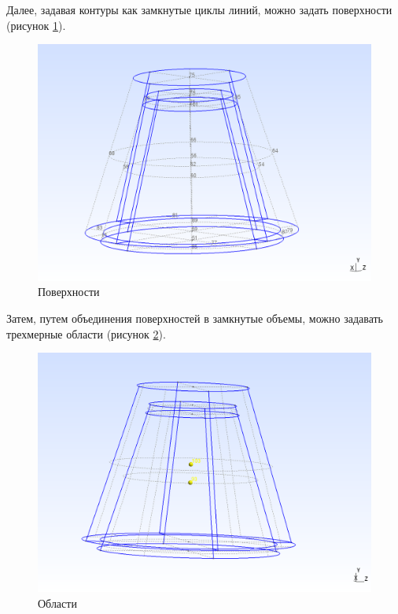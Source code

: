 \documentclass[a4paper, 14pt]{extreport}
\begin{document}
\newpage
Далее, задавая контуры как замкнутые циклы линий,
 можно задать поверхности (рисунок \ref{fig: surfaces}).

\begin{figure}[h]
	\center
	\includegraphics[scale=0.3]{pictures/surfaces.png}
	\caption{Поверхности}
	\label{fig: surfaces}
\end{figure}

Затем, путем объединения поверхностей в замкнутые объемы, можно 
задавать трехмерные области (рисунок \ref{fig: volumes}).

\begin{figure}[h]
	\center
	\includegraphics[scale=0.25]{pictures/volumes.png}
	\caption{Области}
	\label{fig: volumes}
\end{figure}
\end{document}
